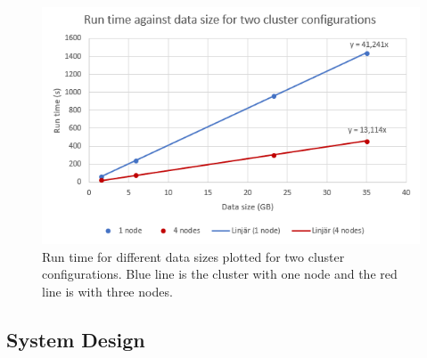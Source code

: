 \begin{figure}[H]
    \centering
    \includegraphics[width=.75\linewidth]{figures/runTime.PNG}
    \caption{Run time for different data sizes plotted for two cluster configurations. Blue line is the cluster with one node and the red line is with three nodes.}
    \label{fig:scalabilityGraph}
\end{figure}


\subsection{System Design}





